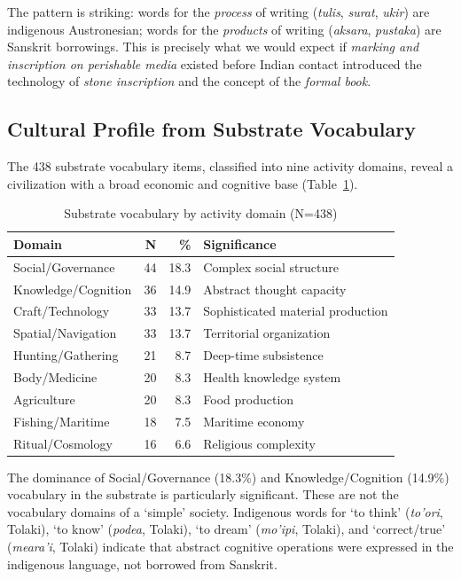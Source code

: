 \documentclass[12pt,a4paper]{article}
\begin{document}
The pattern is striking: words for the \textit{process} of writing (\textit{tulis}, \textit{surat}, \textit{ukir}) are indigenous Austronesian; words for the \textit{products} of writing (\textit{aksara}, \textit{pustaka}) are Sanskrit borrowings. This is precisely what we would expect if \textit{marking and inscription on perishable media} existed before Indian contact introduced the technology of \textit{stone inscription} and the concept of the \textit{formal book}.

\subsection{Cultural Profile from Substrate Vocabulary}

The 438 substrate vocabulary items, classified into nine activity domains, reveal a civilization with a broad economic and cognitive base (Table~\ref{tab:domains}).

\begin{table}[h]
\centering
\caption{Substrate vocabulary by activity domain (N=438)}
\label{tab:domains}
\begin{tabular}{lrrp{5.5cm}}
\toprule
Domain & N & \% & Significance \\
\midrule
Social/Governance & 44 & 18.3 & Complex social structure \\
Knowledge/Cognition & 36 & 14.9 & Abstract thought capacity \\
Craft/Technology & 33 & 13.7 & Sophisticated material production \\
Spatial/Navigation & 33 & 13.7 & Territorial organization \\
Hunting/Gathering & 21 & 8.7 & Deep-time subsistence \\
Body/Medicine & 20 & 8.3 & Health knowledge system \\
Agriculture & 20 & 8.3 & Food production \\
Fishing/Maritime & 18 & 7.5 & Maritime economy \\
Ritual/Cosmology & 16 & 6.6 & Religious complexity \\
\bottomrule
\end{tabular}
\end{table}

The dominance of Social/Governance (18.3\%) and Knowledge/Cognition (14.9\%) vocabulary in the substrate is particularly significant. These are not the vocabulary domains of a `simple' society. Indigenous words for `to think' (\textit{to'ori}, Tolaki), `to know' (\textit{podea}, Tolaki), `to dream' (\textit{mo'ipi}, Tolaki), and `correct/true' (\textit{meara'i}, Tolaki) indicate that abstract cognitive operations were expressed in the indigenous language, not borrowed from Sanskrit.
\end{document}
